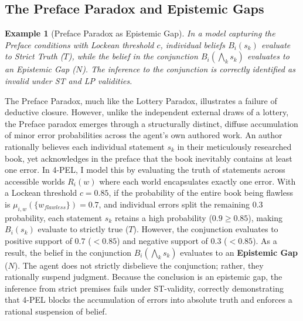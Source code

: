 \documentclass[11pt,a4paper]{article}
\newtheorem{example}{Example}[section]
\begin{document}
\subsection{The Preface Paradox and Epistemic Gaps}
\begin{example}[Preface Paradox as Epistemic Gap]
In a model capturing the Preface conditions with Lockean threshold $c$, individual beliefs $B_i(s_k)$ evaluate to Strict Truth ($T$), while the belief in the conjunction $B_i(\bigwedge_k s_k)$ evaluates to an Epistemic Gap ($N$). The inference to the conjunction is correctly identified as invalid under ST and LP validities.
\end{example}
The Preface Paradox, much like the Lottery Paradox, illustrates a failure of deductive closure. However, unlike the independent external draws of a lottery, the Preface paradox emerges through a structurally distinct, diffuse accumulation of minor error probabilities across the agent's own authored work. An author rationally believes each individual statement $s_k$ in their meticulously researched book, yet acknowledges in the preface that the book inevitably contains at least one error.
In 4-PEL, I model this by evaluating the truth of statements across accessible worlds $R_i(w)$ where each world encapsulates exactly one error. With a Lockean threshold $c=0.85$, if the probability of the entire book being flawless is $\mu_{i,w}(\{w_{flawless}\}) = 0.7$, and individual errors split the remaining $0.3$ probability, each statement $s_k$ retains a high probability ($0.9 \ge 0.85$), making $B_i(s_k)$ evaluate to strictly true ($T$). 
However, the conjunction evaluates to positive support of $0.7$ ($< 0.85$) and negative support of $0.3$ ($< 0.85$). As a result, the belief in the conjunction $B_i(\bigwedge_k s_k)$ evaluates to an \textbf{Epistemic Gap} ($N$). The agent does not strictly disbelieve the conjunction; rather, they rationally suspend judgment. Because the conclusion is an epistemic gap, the inference from strict premises fails under ST-validity, correctly demonstrating that 4-PEL blocks the accumulation of errors into absolute truth and enforces a rational suspension of belief.
\end{document}

